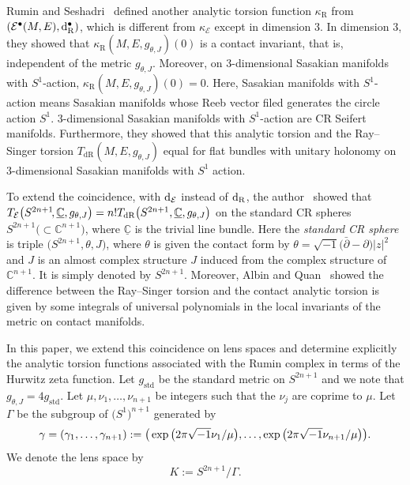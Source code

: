 \documentclass[pdftex]{sigma}
\numberwithin{equation}{section}
\newcommand{\ii}{\sqrt{-1}}
\newcommand{\deRham}{\mathrm{dR}}
\newcommand{\Rumin}{\mathrm{R}}
\newcommand{\RN}{\cE}
\newcommand{\bC}{\mathbb{C}}
\newcommand{\cE}{\mathcal{E}}
\begin{document}
Rumin and Seshadri~\cite{Rumin-Seshadri-12} defined another analytic torsion function $\kappa_{\Rumin}$ from
$(\cE ^\bullet (M,E) , {\rm d}_{\Rumin }^\bullet )$, which is different from $\kappa_\RN $ except in dimension 3.
In dimension 3, they showed that
$\kappa_{\Rumin} (M, E, \allowbreak g_{\theta , J} ) (0)$ is a contact invariant,
that is, independent of the metric $g_{\theta , J}$.
Moreover, on 3-dimensional Sasakian manifolds with $S^1$-action, $\kappa_{\Rumin} (M, E, g_{\theta , J} ) (0) = 0 $.
Here,
Sasakian manifolds with $S^1$-action means Sasakian manifolds whose Reeb vector filed generates the circle action $S^1$.
3-di\-men\-sional Sasakian manifolds with $S^1$-action
are CR Seifert manifolds.
Furthermore, they showed that this analytic torsion and the Ray--Singer torsion $T_{\deRham } (M, E, g_{\theta , J} )$ equal for flat bundles with unitary holonomy on 3-dimensional Sasakian manifolds with $S^1$ action.

To extend the coincidence,
with ${\rm d}_{\RN}$ instead of ${\rm d}_{\Rumin }$,
the author~\cite{Kitaoka-19} showed that $T_{\RN } \big(S^{2n+1}\!, \underline{\bC}, g_{\theta , J} \big) \\= n! T_{\deRham } \big(S^{2n+1}, \underline{\bC}, g_{\theta , J} \big)$ on the standard CR spheres $S^{2n+1} \big({\subset} \bC^{n+1} \big) $,
where $\underline{\bC}$ is the trivial line bundle.
Here the {\em standard CR sphere} is triple $\big(S^{2n+1}, \theta, J\big)$,
where
$\theta$ is given the contact form by $\theta = \sqrt{-1} \big(\bar{\partial} - \partial\big) |z|^2$
and
$J$ is an almost complex structure $J$ induced from the complex structure of $ \bC^{n+1}$.
It is simply denoted by $S^{2n+1}$.
Moreover, Albin and Quan~\cite[Corollary~3 and equation~(4)]{Albin-Quan-20} showed the difference between the Ray--Singer torsion and the contact analytic torsion is given by some integrals of universal polynomials in the local invariants of the metric
on contact manifolds.

In this paper,
we extend this coincidence on lens spaces
and determine explicitly the analytic torsion functions associated with the Rumin complex
in terms of the Hurwitz zeta function.
Let $g_{\mathrm{std}}$ be the standard metric on $S^{2n+1}$
and we note that $g_{\theta , J} = 4 g_{\mathrm{std}}$.
Let $\mu , \nu_1 , \ldots , \nu_{n+1}$ be integers such that the $\nu_j$ are coprime to $\mu$.
Let $\Gamma$ be the subgroup of $\big(S^1\big)^{n+1}$ generated by
\begin{equation}
 \gamma
 = ( \gamma_1 , \ldots , \gamma_{n+1} )
 := \big( \exp \big( 2 \pi \ii \nu_1 / \mu \big), \dots , \exp \big( 2 \pi \ii \nu_{n+1} / \mu \big) \big) .
 \notag
\end{equation}
We denote the lens space by
\[
 K
 :=
 S^{2n+1} / \Gamma
 .
\]
\end{document}
